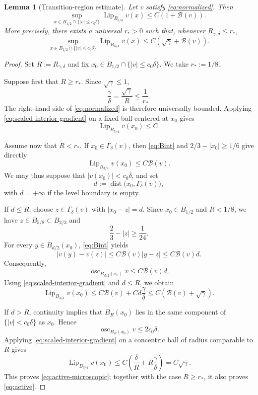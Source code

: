 \documentclass[11pt,letterpaper]{amsart}
\numberwithin{equation}{section}
\DeclareMathOperator{\dist}{dist}
\DeclareMathOperator{\osc}{osc}
\DeclareMathOperator{\Lip}{Lip}
\newtheorem{lemma}[theorem]{Lemma}
\theoremstyle{definition}
\theoremstyle{remark}
\begin{document}
\begin{lemma}[Transition-region estimate]\label{lem:active}
Let $v$ satisfy \eqref{eq:normalized}. Then
\begin{equation}\label{eq:active}
\sup_{x\in B_{1/2}\cap\{|v|\leq c_0\delta\}}
\Lip_{B_{3/4}}v(x)
\leq
C\left(1+\mathcal B(v)\right).
\end{equation}
More precisely, there exists a universal $r_*>0$ such that, whenever
$R_{\gamma,\delta}\leq r_*$,
\begin{equation}\label{eq:active-microscopic}
\sup_{x\in B_{1/2}\cap\{|v|\leq c_0\delta\}}
\Lip_{B_{3/4}}v(x)
\leq
C\left(\sqrt\gamma+\mathcal B(v)\right).
\end{equation}
\end{lemma}

\begin{proof}
Set $R:=R_{\gamma,\delta}$ and fix
$x_0\in B_{1/2}\cap\{|v|\leq c_0\delta\}$. We take $r_*:=1/8$.

Suppose first that $R\geq r_*$. Since $\sqrt\gamma\leq1$,
$$
\frac{\gamma}{\delta}
=
\frac{\sqrt\gamma}{R}
\leq
\frac1{r_*}.
$$
The right-hand side of \eqref{eq:normalized} is therefore universally
bounded. Applying \eqref{eq:scaled-interior-gradient} on a fixed ball centered
at $x_0$ gives
$$
\Lip_{B_{3/4}}v(x_0)\leq C.
$$

Assume now that $R<r_*$. If $x_0\in\Gamma_\delta(v)$, then
\eqref{eq:Bint} and $2/3-|x_0|\geq1/6$ give directly
$$
\Lip_{B_{3/4}}v(x_0)
\leq
C\mathcal B(v).
$$
We may thus suppose that $|v(x_0)|<c_0\delta$, and set
$$
d:=\dist\bigl(x_0,\Gamma_\delta(v)\bigr),
$$
with $d=+\infty$ if the level boundary is empty.

If $d\leq R$, choose $z\in\Gamma_\delta(v)$ with $|x_0-z|=d$. Since
$x_0\in B_{1/2}$ and $R<1/8$, we have $z\in B_{5/8}\subset B_{2/3}$ and
$$
\frac23-|z|\geq\frac1{24}.
$$
For every $y\in B_{d/2}(x_0)$, \eqref{eq:Bint} yields
$$
|v(y)-v(z)|
\leq
C\mathcal B(v)|y-z|
\leq
C\mathcal B(v)d.
$$
Consequently,
$$
\osc_{B_{d/2}(x_0)}v
\leq
C\mathcal B(v)d.
$$
Using \eqref{eq:scaled-interior-gradient} and $d\leq R$, we obtain
$$
\Lip_{B_{3/4}}v(x_0)
\leq
C\mathcal B(v)
+
Cd\frac{\gamma}{\delta}
\leq
C\left(\mathcal B(v)+\sqrt\gamma\right).
$$

If $d>R$, continuity implies that $B_R(x_0)$ lies in the same component of
$\{|v|<c_0\delta\}$ as $x_0$. Hence
$$
\osc_{B_R(x_0)}v
\leq
2c_0\delta.
$$
Applying \eqref{eq:scaled-interior-gradient} on a concentric ball of radius
comparable to $R$ gives
$$
\Lip_{B_{3/4}}v(x_0)
\leq
C\left(
\frac{\delta}{R}
+
R\frac{\gamma}{\delta}
\right)
=
C\sqrt\gamma.
$$
This proves \eqref{eq:active-microscopic}; together with the case
$R\geq r_*$, it also proves \eqref{eq:active}.
\end{proof}
\end{document}

